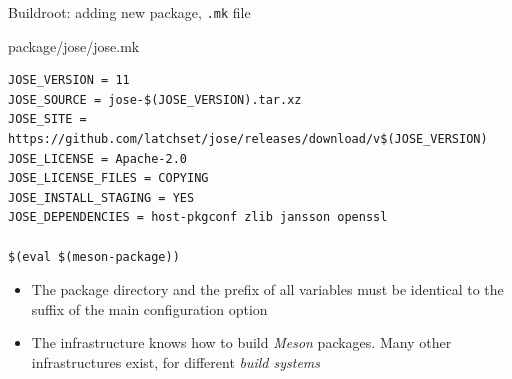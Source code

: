 \begin{frame}[fragile]{Buildroot: adding new package, {\tt .mk} file}
  \begin{block}{package/jose/jose.mk}
    {\scriptsize
\begin{verbatim}
JOSE_VERSION = 11
JOSE_SOURCE = jose-$(JOSE_VERSION).tar.xz
JOSE_SITE = https://github.com/latchset/jose/releases/download/v$(JOSE_VERSION)
JOSE_LICENSE = Apache-2.0
JOSE_LICENSE_FILES = COPYING
JOSE_INSTALL_STAGING = YES
JOSE_DEPENDENCIES = host-pkgconf zlib jansson openssl

$(eval $(meson-package))
\end{verbatim}
      }
    \end{block}
    \begin{itemize}
    \item The package directory and the prefix of all variables must be
      identical to the suffix of the main configuration option
    \item The  infrastructure knows how to build {\em
        Meson} packages. Many other infrastructures exist, for
      different {\em build systems}
    \end{itemize}
\end{frame}


